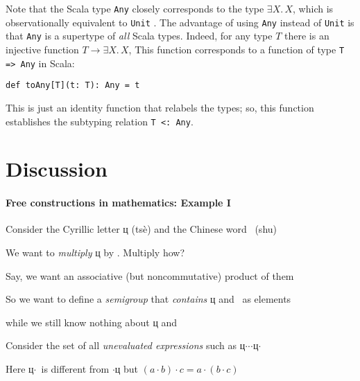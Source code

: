 Note that the Scala type \lstinline!Any!
closely corresponds to the type $\exists X.\,X$, which is observationally
equivalent to \lstinline!Unit!
. The advantage of using \lstinline!Any!
instead of \lstinline!Unit!
is that \lstinline!Any!
is a supertype of \emph{all} Scala types. Indeed, for any type $T$
there is an injective function $T\rightarrow\exists X.\,X$, This
function corresponds to a function of type \lstinline!T => Any!
in Scala:
\begin{lstlisting}
def toAny[T](t: T): Any = t
\end{lstlisting}
 This is just an identity function that relabels the types; so, this
function establishes the subtyping relation \lstinline!T <: Any!.

\section{Discussion}

\paragraph{Free constructions in mathematics: Example I}

Consider the Cyrillic letter \foreignlanguage{russian}{ц} (ts\`{e})
and the Chinese word \shui~(shu)

We want to \emph{multiply} \foreignlanguage{russian}{ц} by \shui.
Multiply how?

Say, we want an associative (but noncommutative) product of them

So we want to define a \emph{semigroup} that \emph{contains} \foreignlanguage{russian}{ц}
and \shui~as elements

while we still know nothing about \foreignlanguage{russian}{ц} and
\shui

Consider the set of all \emph{unevaluated expressions} such as \foreignlanguage{russian}{ц}$\cdot$\shui$\cdot$\shui$\cdot$\foreignlanguage{russian}{ц}$\cdot$\shui

Here \foreignlanguage{russian}{ц}$\cdot$\shui~is different from
\shui$\cdot$\foreignlanguage{russian}{ц} but $\left(a\cdot b\right)\cdot c=a\cdot\left(b\cdot c\right)$

